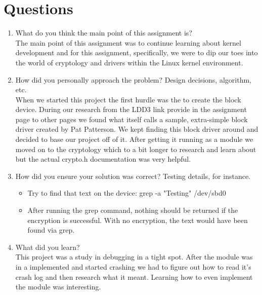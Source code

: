 \documentclass[10pt,drafclsnofoot,onecolumn]{IEEEtran}
\begin{document}
\section{Questions}
\begin{enumerate}
\item{What do you think the main point of this assignment is?}
\\	\indent The main point of this assignment was to continue learning about kernel development and for this assignment, specifically, we were to dip our toes into the world of cryptology and drivers within the Linux kernel environment. \\

\item{How did you personally approach the problem? Design decisions, algorithm, etc.}
\\	\indent When we started this project the first hurdle was the to create the block device. During our research from the LDD3 link provide in the assignment page to other pages we found what itself calls a sample, extra-simple block driver created by Pat Patterson. We kept finding this block driver around and decided to base our project off of it. After getting it running as a module we moved on to the cryptology which to a bit longer to research and learn about but the actual crypto.h documentation was very helpful. \\

\item{How did you ensure your solution was correct? Testing details, for instance.}
\\ \begin{itemize}
	\item Try to find that text on the device: grep -a "Testing" /dev/sbd0
	\item After running the grep command, nothing should be returned if the encryption is successful. With no encryption, the text would have been found via grep. \\
	\end{itemize}

\item{What did you learn?}
\\ \indent This project was a study in debugging in a tight spot. After the module was in a implemented and started crashing we had to figure out how to read it's crash log and then research what it meant. Learning how to even implement the module was interesting.\\

\end{enumerate}
\end{document}
